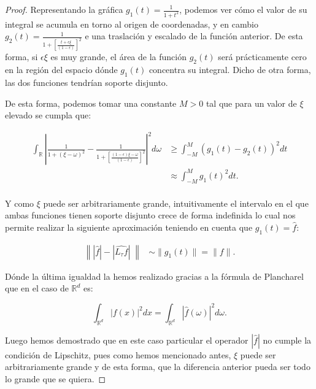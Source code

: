 \begin{proof}
\noindent Representando la gráfica $g_1(t)= \frac{1}{1+t^2}$, podemos ver cómo el valor de su integral se acumula en torno al origen de coordenadas, y en cambio $g_2(t)=\frac{1}{1+\left[ \frac{t+\epsilon\xi}{(1-\epsilon)}\right]^2}$ e una traslación y escalado de la función anterior. De esta forma, si $\epsilon\xi$ es muy grande, el área de la función $g_2(t)$ será prácticamente cero en la región del espacio dónde $g_1(t)$ concentra su integral. Dicho de otra forma, las dos funciones tendrían soporte disjunto.

\noindent De esta forma, podemos tomar una constante $M>0$ tal que para un valor de $\xi$ elevado se cumpla que: 

\begin{align*}
  \int_{\mathbb{R}} \left| \frac{1}{1+(\xi - \omega)^2} - \frac{1}{1+\left[ \frac{(1-\epsilon) \xi - \omega}{(1-\epsilon)}\right]^2} \right|^2 d\omega 
  &\geq \int_{-M}^{M} (g_1(t)-g_2(t))^2 dt \\
  &\approx \int_{-M}^{M} g_1(t)^2 dt. \\
\end{align*}

\noindent Y como $\xi$ puede ser arbitrariamente grande, intuitivamente el intervalo en el que ambas funciones tienen soporte disjunto crece de forma indefinida lo cual nos permite realizar la siguiente aproximación teniendo en cuenta que $g_1(t)=\widehat{f}$:

\begin{align*} \label{eq::1.1}
  \left\| |\widehat{f}| -|\widehat{L_\tau f}| \; \right\| &\sim \|g_1(t) \|=\|f\|. 
\end{align*}

\noindent Dónde la última igualdad la hemos realizado gracias a la fórmula de Plancharel que en el caso de $\mathbb{R}^d$ es: 

\begin{equation} \label{eq::Plancharel}
  \int_{\mathbb{R}^d} \left|f(x)\right|^2 dx= \int_{\mathbb{R}^d}\left|\widehat{f}(\omega)\right|^2 d\omega.
\end{equation}

\noindent Luego hemos demostrado que en este caso particular el operador $|\widehat{f}|$ no cumple la condición de Lipschitz, pues como hemos mencionado antes, $\xi$ puede ser arbitrariamente grande y de esta forma, que la diferencia anterior pueda ser todo lo grande que se quiera.


\end{proof}
